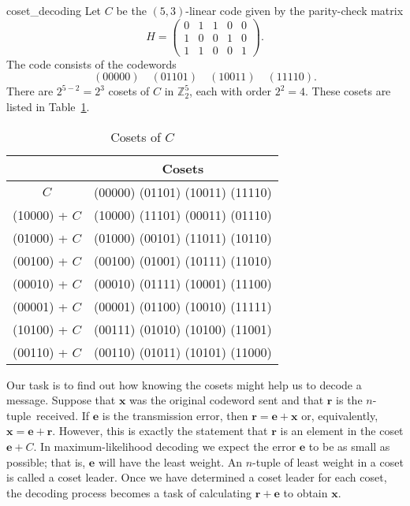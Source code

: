  
\begin{example}{coset_decoding}
Let $C$ be the $(5,3)$-linear code given by the parity-check matrix
\[
H =
\begin{pmatrix}
0 & 1 & 1 & 0 & 0 \\
1 & 0 & 0 & 1 & 0 \\
1 & 1 & 0 & 0 & 1
\end{pmatrix}.
\]
The code consists of the codewords
\[
(00000) \quad (01101) \quad (10011) \quad (11110).
\]
There are $2^{5-2} = 2^3$ cosets of $C$ in ${\mathbb Z}_2^5$, each with
order $2^2 =4$.  These cosets are listed in Table~\ref{CosetsofC}. 
\end{example}
 
 
\begin{table}
{\small
\begin{center}
\medskip
\begin{tabular}{|c|c|}
\hline
 & Cosets \\
\hline
          $C$ & (00000)  (01101)  (10011)  (11110) \\
(10000) + $C$ & (10000)  (11101)  (00011)  (01110) \\
(01000) + $C$ & (01000)  (00101)  (11011)  (10110) \\
(00100) + $C$ & (00100)  (01001)  (10111)  (11010) \\
(00010) + $C$ & (00010)  (01111)  (10001)  (11100) \\
(00001) + $C$ & (00001)  (01100)  (10010)  (11111) \\
(10100) + $C$ & (00111)  (01010)  (10100)  (11001) \\
(00110) + $C$ & (00110)  (01011)  (10101)  (11000) \\
\hline
\end{tabular}
\end{center}
}
\caption{Cosets of $C$}\label{CosetsofC}
\end{table}
 
 

 
 
Our task is to find out how knowing the cosets might help us to 
decode a
message. Suppose that ${\mathbf x}$ was the original codeword sent and
that ${\mathbf r}$ is the \mbox{$n$-tuple received}. If ${\mathbf e}$ is the
transmission error, then ${\mathbf r} = {\mathbf e} + {\mathbf x}$ or,
equivalently, ${\mathbf x} = {\mathbf e} + {\mathbf r}$. However, this is
exactly the statement that ${\mathbf r}$ is an element in the coset 
${\mathbf e} + C$. In maximum-likelihood decoding we expect the error
${\mathbf e}$ to be as small as possible; that is, ${\mathbf e}$ will have
the least weight. An $n$-tuple of least weight in a coset is called a
{\bfi coset leader}. Once we have determined a
coset leader for each coset, the decoding process becomes a task
of calculating ${\mathbf r} + {\mathbf e}$ to obtain ${\mathbf x}$.
 
